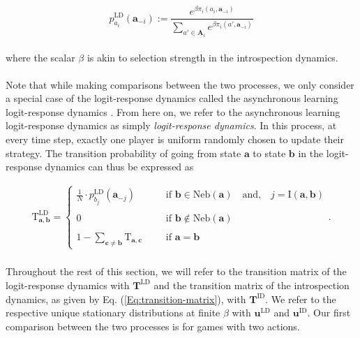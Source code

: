 \documentclass[11pt]{article}
\theoremstyle{plainCl1}
\theoremstyle{plainCl2}
\newcommand{\A}{\mathbf{A}}
\newcommand{\abf}{\mathbf{a}}
\newcommand{\bbf}{\mathbf{b}}
\newcommand{\cbf}{\mathbf{c}}
\newcommand{\T}{\mathbf{T}}
\newcommand{\ubf}{\mathbf{u}}
\newcommand{\LD}{\mathrm{LD}}
\newcommand{\ID}{\mathrm{ID}}
\begin{document}
\begin{equation}
p^{\LD}_{a_i}(\abf_{-i}) := \frac{\displaystyle e^{\beta \pi_i(a_i,\abf_{-i})}}{\displaystyle \sum_{a' \in \A_i} e^{\beta \pi_i(a',\abf_{-i})}}
\end{equation}
\\
\noindent where the scalar $\beta$ is akin to selection strength in the introspection dynamics. \\ \\
\noindent Note that while making comparisons between the two processes, we only consider a special case of the logit-response dynamics called the asynchronous learning logit-response dynamics \cite{Blume:GEB:1993}. From here on, we refer to the asynchronous learning logit-response dynamics as simply \emph{logit-response dynamics}. In this process, at every time step, exactly one player is uniform randomly chosen to update their strategy. The transition probability of going from state $\abf$ to state $\bbf$ in the logit-response dynamics can thus be expressed as

\begin{align}
\mathrm{T}^\LD_{\abf, \bbf} = 
\begin{cases}
\frac{1}{N}  \cdot p^\LD_{b_{j}} (\abf_{-j}) \quad  \quad &\text{ if }\bbf \in \mathrm{Neb}(\abf) \quad \text{and,} \quad j = \mathrm{I}(\abf,\bbf)\\ \\ 
0 \quad &\text{ if } \bbf \notin \mathrm{Neb}(\abf) \\ \\
1 - \sum_{\cbf \neq \bbf} \mathrm{T}_{\abf,\cbf} \quad &\text{ if } \abf = \bbf
\end{cases}.
\label{Eq:transition-matrix-logit}
\end{align} \\ 

\noindent Throughout the rest of this section, we will refer to the transition matrix of the logit-response dynamics with $\T^{\LD}$ and the transition matrix of the introspection dynamics, as given by Eq. (\ref{Eq:transition-matrix}), with $\T^{\ID}$. We refer to the respective unique stationary distributions at finite $\beta$ with $\ubf^\LD$ and $\ubf^\ID$. Our first comparison between the two processes is for games with two actions.
\end{document}
